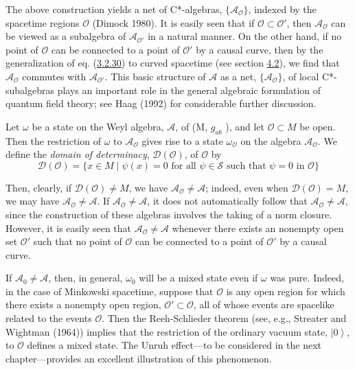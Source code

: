 \documentclass[11pt,a4paper]{article}
\providecommand{\ket}[1]{\left\lvert#1\right\rangle}
\begin{document}
The above construction yields a net of C*-algebras, \(\{\mathcal A_{\mathcal O}\}\), indexed by the spacetime regions \(\mathcal{O}\) (Dimock 1980). It is easily seen that if \(\mathcal{O} \subset \mathcal{O}'\), then \(\mathcal{A}_{\mathcal{O}}\) can be viewed as a subalgebra of \(\mathcal{A}_{\mathcal{O}'}\) in a natural manner. On the other hand, if no point of \(\mathcal{O}\) can be connected to a point of \(\mathcal{O}'\) by a causal curve, then by the generalization of eq. (\hyperref[eq:3.2.30]{3.2.30}) to curved spacetime (see section \hyperlink{sec:4.2}{4.2}), we find that \(\mathcal{A}_{\mathcal{O}}\) commutes with \(\mathcal{A}_{\mathcal{O}'}\). This basic structure of \(\mathcal{A}\) as a net, \(\{\mathcal{A}_{\mathcal{O}}\}\), of local C*-subalgebras plays an important role in the general algebraic formulation of quantum field theory; see Haag (1992) for considerable further discussion.

Let \(\omega\) be a state on the Weyl algebra, \(\mathcal{A}\), of (M, \(g_{ab}\) ), and let \(\mathcal{O} \subset M\) be open. Then the restriction of \(\omega\) to \(\mathcal{A}_{\mathcal{O}}\) gives rise to a state \(\omega_{\mathcal{O}}\) on the algebra \(\mathcal{A}_{\mathcal{O}}\). We define the \emph{domain of determinacy}, \(\mathcal{D}(\mathcal{O})\), of \(\mathcal{O}\) by
\begin{equation*}
\mathcal{D}(\mathcal{O}) = \{ x \in M \mid \psi(x) = 0 \text{ for all } \psi \in \mathcal{S} \text{ such that } \psi = 0 \text{ in } \mathcal{O} \} \tag{4.5.18}\label{eq:4.5.18}
\end{equation*}

Then, clearly, if \(\mathcal{D}(\mathcal{O}) \neq M\), we have \(\mathcal{A}_{\mathcal{O}} \neq \mathcal{A}\); indeed, even when \(\mathcal{D}(\mathcal{O}) = M\), we may have \(\mathcal{A}_{\mathcal{O}} \neq \mathcal{A}\). If \(\mathcal{A}_{\mathcal{O}} \neq \mathcal{A}\), it does not automatically follow that \(\mathcal{A}_{\mathcal{O}} \neq \mathcal{A}\), since the construction of these algebras involves the taking of a norm closure. However, it is easily seen that \(\mathcal{A}_{\mathcal{O}} \neq \mathcal{A}\) whenever there exists an nonempty open set \(\mathcal{O}'\) such that no point of \(\mathcal{O}\) can be connected to a point of \(\mathcal{O}'\) by a causal curve.

If \(\mathcal{A}_{0} \neq \mathcal{A}\), then, in general, \(\omega_{0}\) will be a mixed state even if \(\omega\) \hypertarget{source-98}{} was pure. Indeed, in the case of Minkowski spacetime, suppose that \(\mathcal{O}\) is any open region for which there exists a nonempty open region, \(\mathcal{O}'\subset \mathcal{O}\), all of whose events are spacelike related to the events \(\mathcal{O}\). Then the Reeh-Schlieder theorem (see, e.g., Streater and Wightman (1964)) implies that the restriction of the ordinary vacuum state, \(\ket{0}\), to \(\mathcal{O}\) defines a mixed state. The Unruh effect---to be considered in the next chapter---provides an excellent illustration of this phenomenon.
\end{document}
